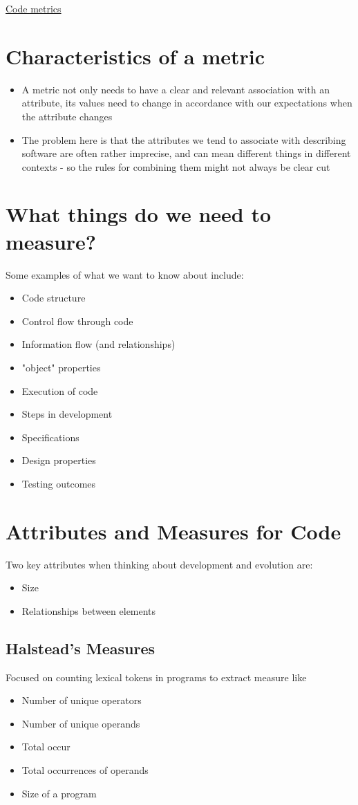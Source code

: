 \documentclass{article}[18pt]
\begin{document}
\begin{center}
\underline{\huge Code metrics}
\end{center}
\section{Characteristics of a metric}
\begin{itemize}
	\item A metric not only needs to have a clear and relevant association with an attribute, its values need to change in accordance with our expectations when the attribute changes
	\item The problem here is that the attributes we tend to associate with describing software are often rather imprecise, and can mean different things in different contexts - so the rules for combining them might not always be clear cut
\end{itemize}
\section{What things do we need to measure?}
Some examples of what we want to know about include:
\begin{itemize}
	\item Code structure
	\item Control flow through code
	\item Information flow (and relationships)
	\item "object" properties
	\item Execution of code
	\item Steps in development
	\item Specifications
	\item Design properties
	\item Testing outcomes
\end{itemize}
\section{Attributes and Measures for Code}
Two key attributes when thinking about development and evolution are:
\begin{itemize}
	\item Size
	\item Relationships between elements
\end{itemize}
\subsection{Halstead's Measures}
Focused on counting lexical tokens in programs to extract measure like
\begin{itemize}
	\item Number of unique operators
	\item Number of unique operands
	\item Total occur
	\item Total occurrences of operands
	\item Size of a program	
\end{itemize}
\end{document}
